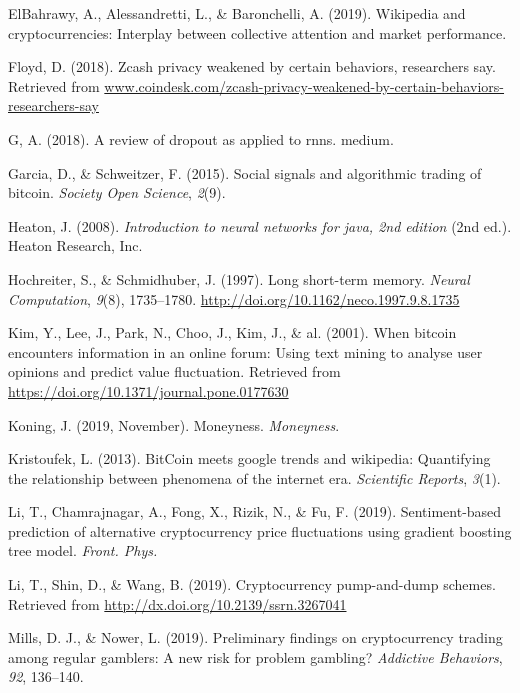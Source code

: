 \documentclass[12pt,twoside]{dukestatscithesis}
\begin{document}
\hypertarget{ref-elbahrawy2019}{}
ElBahrawy, A., Alessandretti, L., \& Baronchelli, A. (2019). Wikipedia
and cryptocurrencies: Interplay between collective attention and market
performance.

\hypertarget{ref-floyd2018}{}
Floyd, D. (2018). Zcash privacy weakened by certain behaviors,
researchers say. Retrieved from
\url{www.coindesk.com/zcash-privacy-weakened-by-certain-behaviors-researchers-say}

\hypertarget{ref-g2018}{}
G, A. (2018). A review of dropout as applied to rnns. medium.

\hypertarget{ref-garcia2015}{}
Garcia, D., \& Schweitzer, F. (2015). Social signals and algorithmic
trading of bitcoin. \emph{Society Open Science}, \emph{2}(9).

\hypertarget{ref-heaton2008}{}
Heaton, J. (2008). \emph{Introduction to neural networks for java, 2nd
edition} (2nd ed.). Heaton Research, Inc.

\hypertarget{ref-sepp1997}{}
Hochreiter, S., \& Schmidhuber, J. (1997). Long short-term memory.
\emph{Neural Computation}, \emph{9}(8), 1735--1780.
\url{http://doi.org/10.1162/neco.1997.9.8.1735}

\hypertarget{ref-kim2017}{}
Kim, Y., Lee, J., Park, N., Choo, J., Kim, J., \& al. (2001). When
bitcoin encounters information in an online forum: Using text mining to
analyse user opinions and predict value fluctuation. Retrieved from
\url{https://doi.org/10.1371/journal.pone.0177630}

\hypertarget{ref-koning2019}{}
Koning, J. (2019, November). Moneyness. \emph{Moneyness}.

\hypertarget{ref-kristoufek2013}{}
Kristoufek, L. (2013). BitCoin meets google trends and wikipedia:
Quantifying the relationship between phenomena of the internet era.
\emph{Scientific Reports}, \emph{3}(1).

\hypertarget{ref-li2019b}{}
Li, T., Chamrajnagar, A., Fong, X., Rizik, N., \& Fu, F. (2019).
Sentiment-based prediction of alternative cryptocurrency price
fluctuations using gradient boosting tree model. \emph{Front. Phys.}

\hypertarget{ref-li2019a}{}
Li, T., Shin, D., \& Wang, B. (2019). Cryptocurrency pump-and-dump
schemes. Retrieved from \url{http://dx.doi.org/10.2139/ssrn.3267041}

\hypertarget{ref-mills2019}{}
Mills, D. J., \& Nower, L. (2019). Preliminary findings on
cryptocurrency trading among regular gamblers: A new risk for problem
gambling? \emph{Addictive Behaviors}, \emph{92}, 136--140.
\end{document}
